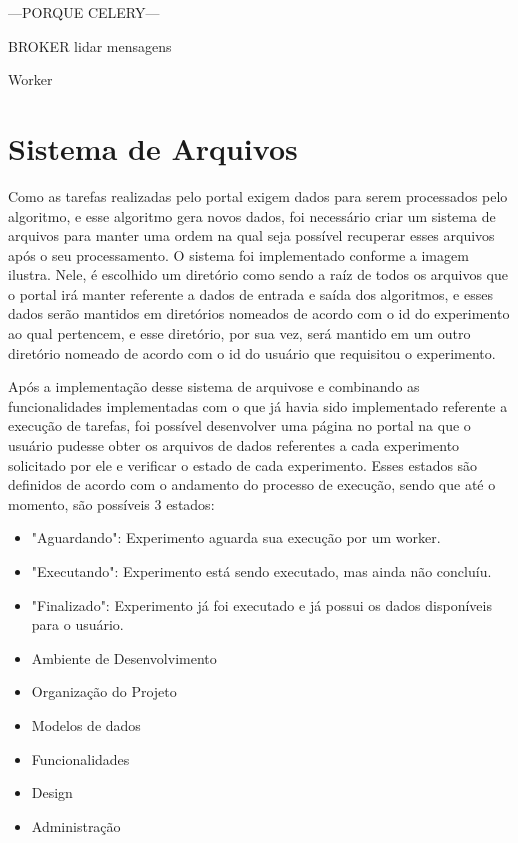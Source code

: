 \documentclass[tg]{mdtufsm}
\begin{document}
---PORQUE CELERY---

BROKER lidar mensagens

Worker

\section{Sistema de Arquivos}
Como as tarefas realizadas pelo portal exigem dados para serem processados pelo algoritmo, e esse algoritmo gera novos dados, foi necessário criar um sistema de arquivos para manter uma ordem na qual seja possível recuperar esses arquivos após o seu processamento.
O sistema foi implementado conforme a imagem ilustra. Nele, é escolhido um diretório como sendo a raíz de todos os arquivos que o portal irá manter referente a dados de entrada e saída dos algoritmos, e esses dados serão mantidos em diretórios nomeados de acordo com o id do experimento ao qual pertencem, e esse diretório, por sua vez, será mantido em um outro diretório nomeado de acordo com o id do usuário que requisitou o experimento.

Após a implementação desse sistema de arquivose e combinando as funcionalidades implementadas com o que já havia sido implementado referente a execução de tarefas, foi possível desenvolver uma página no portal na que o usuário pudesse obter os arquivos de dados referentes a cada experimento solicitado por ele e verificar o estado de cada experimento. Esses estados são definidos de acordo com o andamento do processo de execução, sendo que até o momento, são possíveis 3 estados: 


\begin{itemize}
	\item "Aguardando": Experimento aguarda sua execução por um worker.
	\item "Executando": Experimento está sendo executado, mas ainda não concluíu.
	\item "Finalizado": Experimento já foi executado e já possui os dados disponíveis para o usuário.
\end{itemize}

\begin{itemize}
	\item Ambiente de Desenvolvimento
	\item Organização do Projeto
	\item Modelos de dados
	\item Funcionalidades
	\item Design
	\item Administração
\end{itemize}
\end{document}
